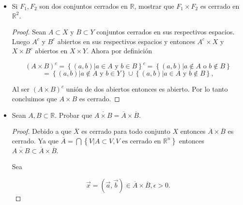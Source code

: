 \documentclass[letterpaper]{article}
\theoremstyle{definition}
\theoremstyle{lemathm}
\theoremstyle{lemathm}
\newtheorem{sol}{Solución}
\theoremstyle{lemathm}
\theoremstyle{lemademthm}
\newcommand{\limtoinf}[1]{\lim_{#1\to\infty}}
\newcommand{\txty}{\text{ y }}
\newcommand{\txto}{\text{ o }}
\newcommand{\pars}[1]{\left( #1 \right) }
\newcommand{\set}[1]{\left \{ #1 \right\} }
\newcommand{\RR}{\mathbb{R}}
\newcommand{\1}{\mathbbm{1}}
\begin{document}
\begin{enumerate}
\begin{itemize}
\begin{sol}
				Ya que $\limtoinf{n} \vec{x}_n = \vec{x} = \pars{\vec{x}_1,\vec{x}_2}$ entonces 
				
				\[\limtoinf{n} \pars{\vec{x}_n}_1 = \vec{x}_1 \txty \limtoinf{n} \frac{1}{\pars{\vec{x}_n}_1} = \vec{x}_2,\]
				
				pero este  último es (por ser $1/x$ una función continua) 
				
				\[\frac{1}{\vec{x}_1} = \frac{1}{\limtoinf{n}\pars{\vec{x}_n}_1} = \limtoinf{n} \frac{1}{\pars{\vec{x}_n}_1} = \vec{x}_2,\]
				
				por lo que $\vec{x}\in A$. Por lo tanto $A'\subset A$ y concluimos que $A$ es cerrado.

			\end{sol}
			
			\item Si $F_1,F_2$ son dos conjuntos cerrados en $\RR$, mostrar que $F_1\times F_2$ es cerrado en $\RR^2$.
			
			\begin{proof}

				Sean $A\subset X$ y $B\subset Y$ conjuntos cerrados en sus respectivos espacios. Luego $A^c$ y $B^c$ abiertos en sus respectivos espacios y entonces $A^c\times X$ y $X\times B^c$ abiertos en $X\times Y$. Ahora por definición

				\[\pars{A\times B}^c = \set{\pars{a,b} | a\in A \txty b\in B}^c = \set{\pars{a,b}| a\not\in A \txto b\not\in B}\]
				\[= \set{\pars{a,b}| a\not\in A \txty b\in Y} \cup \set{\pars{a,b}| a\in A \txty b\not\in B},\]

				Al ser $\pars{A\times B}^c$ unión de dos abiertos entonces es abierto. Por lo tanto concluimos que $A\times B$ es cerrado.
				
			\end{proof}
			

			\item Sean $A,B\subset \RR$. Probar que $\overline{A\times B} = \overline{A} \times \overline{B}$.
			
			\begin{proof}
				
				Debido a que $\overline{X}$ es cerrado para todo conjunto $X$ entonces $\overline{A} \times \overline{B}$ es cerrado. Ya que $\overline{A} = \bigcap\set{V|A\subset V, V \text{ es cerrado en } \RR^n}$ entonces $\overline{A\times B} \subset \overline{A} \times \overline{B}$.

				Sea 
				
				\[\vec{x} = \pars{\vec{a},\vec{b}} \in \overline{A} \times \overline{B}, \epsilon > 0.\]
				

\end{proof}
\end{itemize}
\end{enumerate}
\end{document}
